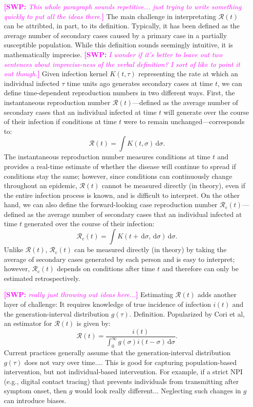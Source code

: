 \documentclass[12pt]{article}
\newcommand{\comment}{\showcomment}
\newcommand{\showcomment}[3]{\textcolor{#1}{\textbf{[#2: }\textsl{#3}\textbf{]}}}
\newcommand{\swp}[1]{\comment{magenta}{SWP}{#1}}
\newcommand{\Rx}[1]{\ensuremath{{\mathcal R}_{#1}}\xspace}
\newcommand{\Rc}{\Rx{\mathrm{c}}}
\newcommand{\RR}{\ensuremath{{\mathcal R}}\xspace}
\newcommand{\dd}[1]{\ensuremath{\, \mathrm{d}#1}}
\newcommand{\dsigma}{\dd{\sigma}}
\begin{document}
\swp{This whole paragraph sounds repetitive... just trying to write something quickly to put all the ideas there.}
The main challenge in interpretating $\RR(t)$ can be attribted, in part, to its definition.
Typically, it has been defined as the average number of secondary cases caused by a primary case in a partially susceptible population.
While this definition sounds seemingly intuitive, it is mathematically imprecise.
\swp{I wonder if it's better to leave out two sentences about imprecise-ness of the verbal definition? I sort of like to point it out though.}
Given infection kernel $K(t, \tau)$ representing the rate at which an individual infected $\tau$ time units ago generates secondary cases at time $t$, we can define time-dependent reproduction numbers in two different ways.
First, the instantaneous reproduction number $\RR(t)$---defined as the average number of secondary cases that an individual infected at time $t$ will generate over the course of their infection if conditions at time $t$ were to remain unchanged---corresponds to:
\begin{equation}
\RR(t) = \int K(t, \sigma) \dsigma.
\end{equation}
The instantaneous reproduction number measures conditions at time $t$ and provides a real-time estimate of whether the disease will continue to spread if conditions stay the same;
however, since conditions can continuously change throughout an epidemic, $\RR(t)$ cannot be measured directly (in theory), even if the entire infection process is known, and is difficult to interpret.
On the other hand, we can also define the forward-looking case reproduction number $\Rc(t)$---defined as the average number of secondary cases that an individual infected at time $t$ generated over the course of their infection:
\begin{equation}
\Rc(t) = \int K(t+\dsigma, \dsigma) \dsigma.
\end{equation}
Unlike $\RR(t)$, $\Rc(t)$ can be measured directly (in theory) by taking the average of secondary cases generated by each person and is easy to interpret;
however, $\Rc(t)$ depends on conditions after time $t$ and therefore can only be estimated retrospectively.

\swp{really just throwing out ideas here...}
Estimating $\RR(t)$ adds another layer of challenge: 
It requires knowledge of true incidence of infection $i(t)$ and the generation-interval distribution $g(\tau)$. Definition.
Popularized by Cori et al, an estimator for $\RR(t)$ is given by:
\begin{equation}
\RR(t) = \frac{i(t)}{\int_0^\infty g(\sigma) i(t-\sigma) \dsigma}.
\end{equation}
Current practices generally assume that the generation-interval distribution $g(\tau)$ does not vary over time....
This is good for capturing population-based intervention, but not individual-based intervention.
For example, if a strict NPI (e.g., digital contact tracing) that prevents individuals from transmitting after symptom onset, then $g$ would look really different...
Neglecting such changes in $g$ can introduce biases.
\end{document}
